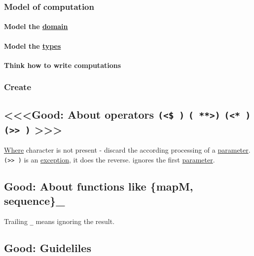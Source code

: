 \documentclass[11pt]{article}
\begin{document}
\subsubsection{Model of computation}
\label{sec:orged4ac54}

\paragraph{Model the \hyperref[org494b48a]{domain}}
\label{sec:org3525070}

\paragraph{Model the \hyperref[org4209edd]{types}}
\label{sec:orgd3cc4d5}

\paragraph{Think how to write computations}
\label{sec:org91a2aab}

\subsubsection{Create}
\label{sec:orgb9e2963}

\subsection{<<<Good: About operators \texttt{(<\$ )} \texttt{( **>)} \texttt{(<* )} \texttt{(>> )} >>>}
\label{sec:orgeeee159}
\hyperref[org3e5903d]{Where} character is not present - discard the according processing of a \hyperref[org0e7674e]{parameter}.\\
\texttt{(>> )} is an \hyperref[org39ea709]{exception}, it does the reverse. ignores the first \hyperref[org0e7674e]{parameter}.\\

\subsection{\label{orgb57df50}Good: About functions like \{mapM, sequence\}\_}
\label{sec:org397e9d9}
Trailing \texttt{\_} means ignoring the result.\\

\subsection{\label{org86c12ee}Good: Guideliles}
\label{sec:orgcb369de}
\end{document}
